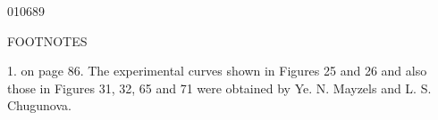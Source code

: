 \begin{scanpage}{0106}{89}
\begin{center}FOOTNOTES\end{center}
1. on page 86. The experimental curves shown in Figures 25 and 26 and also those in Figures 31, 32, 65 and 71 were obtained by Ye. N. Mayzels and L. S. Chugunova.
\end{scanpage}
